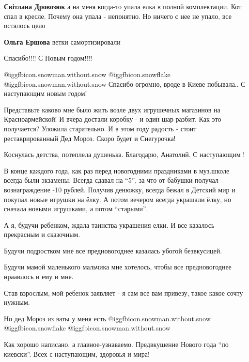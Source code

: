 \begin{itemize}
\begin{itemize} %
\textbf{Світлана Дровозюк} а на меня когда-то упала елка в полной комплектации. Кот спал в кресле. Почему она упала - непонятно. Но ничего с нее не упало, все осталось цело

\textbf{Ольга Ершова} ветки самортизировали
\end{itemize} %

Спасибо!!!! С Новым годом!!!!


@igg{fbicon.snowman.without.snow} @igg{fbicon.snowflake}
@igg{fbicon.snowman.without.snow} Спасибо огромно, вроде в Киеве побывала.. С
наступающим новым годом!


Представьте каково мне было жить возле двух игрушечных магазинов на
Красноармейской! И вчера достали коробку - и один шар разбит. Как это
получается? Уложила старательно. И в этом году радость - стоит реставрированный
Дед Мороз. Скоро будет и Снегурочка!


Коснулась детства, потеплела душенька. Благодарю, Анатолий. С наступающим !


В конце каждого года, как раз перед новогодними праздниками в муз.школе всегда
были экзамены. Всегда сдавал на \enquote{5}, за что от бабушки получал вознаграждение
-10 рублей. Получив денюжку, всегда бежал в Детский мир и покупал новые игрушки
на ёлку. А потом вечером всегда украшали ёлку, но сначала новыми игрушками, а
потом \enquote{старыми}.



А я, будучи ребенком, ждала таинства украшения елки. И все казалось прекрасным и сказочным.

Будучи подростком мне все предновогоднее казалась убогой безвкусицей.

Будучи мамой маленького мальчика мне хотелось, чтобы все предновогоднее нрааилось и ему и мне.

Став взрослым, мой ребенок заявляет - я сам все вам привезу, такое какое сочту нужным.

Но дед Мороз из ваты у меня есть  @igg{fbicon.snowman.without.snow} @igg{fbicon.snowflake} @igg{fbicon.snowman.without.snow} 

Как хорошо написано, а главное-узнаваемо. Предвкушение Нового года \enquote{по киевски}. Всех с наступающим, здоровья и мира!


\end{itemize}
